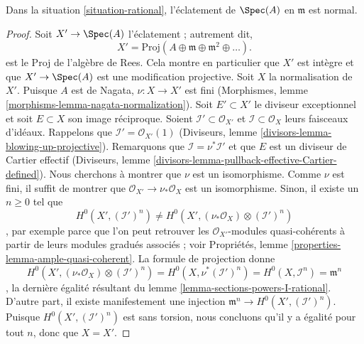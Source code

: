 \begin{lemma} \label{lemma-blow-up-normal-rational} Dans la situation \ref{situation-rational}, l'éclatement de $\Spec(A)$ en $\mathfrak m$ est normal. \end{lemma}

\begin{proof} Soit $X' \to \Spec(A)$ l'éclatement ; autrement dit, $$
X' = \text{Proj}(A \oplus \mathfrak m \oplus \mathfrak m^2 \oplus \ldots).
$$ est le Proj de l'algèbre de Rees. Cela montre en particulier que $X'$ est intègre et que $X' \to \Spec(A)$ est une modification projective. Soit $X$ la normalisation de $X'$. Puisque $A$ est de Nagata, $\nu : X \to X'$ est fini (Morphismes, lemme \ref{morphisms-lemma-nagata-normalization}). Soit $E' \subset X'$ le diviseur exceptionnel et soit $E \subset X$ son image réciproque. Soient $\mathcal{I}' \subset \mathcal{O}_{X'}$ et $\mathcal{I} \subset \mathcal{O}_X$ leurs faisceaux d'idéaux. Rappelons que $\mathcal{I}' = \mathcal{O}_{X'}(1)$ (Diviseurs, lemme \ref{divisors-lemma-blowing-up-projective}). Remarquons que $\mathcal{I} = \nu^*\mathcal{I}'$ et que $E$ est un diviseur de Cartier effectif (Diviseurs, lemme \ref{divisors-lemma-pullback-effective-Cartier-defined}). Nous cherchons à montrer que $\nu$ est un isomorphisme. Comme $\nu$ est fini, il suffit de montrer que $\mathcal{O}_{X'} \to \nu_*\mathcal{O}_X$ est un isomorphisme. Sinon, il existe un $n \geq 0$ tel que $$
H^0(X', (\mathcal{I}')^n) \not =
H^0(X', (\nu_*\mathcal{O}_X) \otimes (\mathcal{I}')^n)
$$, par exemple parce que l'on peut retrouver les $\mathcal{O}_{X'}$-modules quasi-cohérents à partir de leurs modules gradués associés ; voir Propriétés, lemme \ref{properties-lemma-ample-quasi-coherent}. La formule de projection donne $$
H^0(X', (\nu_*\mathcal{O}_X) \otimes (\mathcal{I}')^n) =
H^0(X, \nu^*(\mathcal{I}')^n) =
H^0(X, \mathcal{I}^n) = \mathfrak m^n
$$, la dernière égalité résultant du lemme \ref{lemma-sections-powers-I-rational}. D'autre part, il existe manifestement une injection $\mathfrak m^n \to H^0(X', (\mathcal{I}')^n)$. Puisque $H^0(X', (\mathcal{I}')^n)$ est sans torsion, nous concluons qu'il y a égalité pour tout $n$, donc que $X = X'$. \end{proof}

